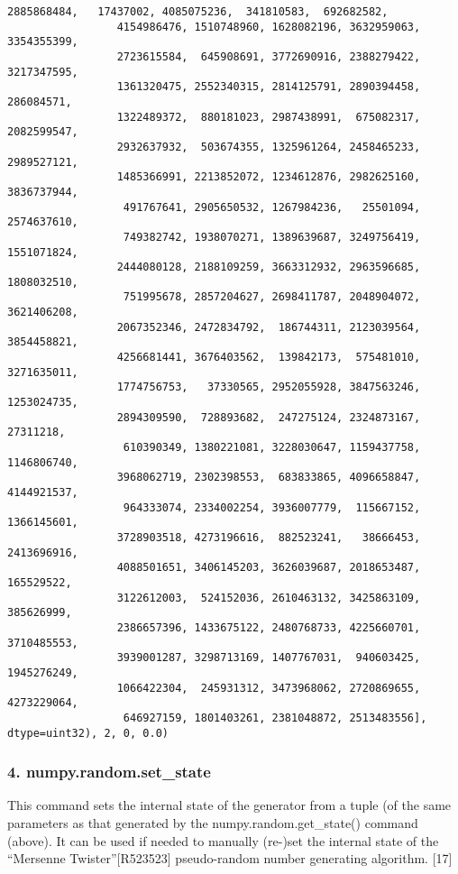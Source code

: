 \documentclass[11pt]{article}
\begin{document}
\begin{Verbatim}[commandchars=\\\{\}]
                 2885868484,   17437002, 4085075236,  341810583,  692682582,
                 4154986476, 1510748960, 1628082196, 3632959063, 3354355399,
                 2723615584,  645908691, 3772690916, 2388279422, 3217347595,
                 1361320475, 2552340315, 2814125791, 2890394458,  286084571,
                 1322489372,  880181023, 2987438991,  675082317, 2082599547,
                 2932637932,  503674355, 1325961264, 2458465233, 2989527121,
                 1485366991, 2213852072, 1234612876, 2982625160, 3836737944,
                  491767641, 2905650532, 1267984236,   25501094, 2574637610,
                  749382742, 1938070271, 1389639687, 3249756419, 1551071824,
                 2444080128, 2188109259, 3663312932, 2963596685, 1808032510,
                  751995678, 2857204627, 2698411787, 2048904072, 3621406208,
                 2067352346, 2472834792,  186744311, 2123039564, 3854458821,
                 4256681441, 3676403562,  139842173,  575481010, 3271635011,
                 1774756753,   37330565, 2952055928, 3847563246, 1253024735,
                 2894309590,  728893682,  247275124, 2324873167,   27311218,
                  610390349, 1380221081, 3228030647, 1159437758, 1146806740,
                 3968062719, 2302398553,  683833865, 4096658847, 4144921537,
                  964333074, 2334002254, 3936007779,  115667152, 1366145601,
                 3728903518, 4273196616,  882523241,   38666453, 2413696916,
                 4088501651, 3406145203, 3626039687, 2018653487,  165529522,
                 3122612003,  524152036, 2610463132, 3425863109,  385626999,
                 2386657396, 1433675122, 2480768733, 4225660701, 3710485553,
                 3939001287, 3298713169, 1407767031,  940603425, 1945276249,
                 1066422304,  245931312, 3473968062, 2720869655, 4273229064,
                  646927159, 1801403261, 2381048872, 2513483556], dtype=uint32), 2, 0, 0.0)
\end{Verbatim}
            
    \subsubsection{4. numpy.random.set\_state}\label{numpy.random.set_state}

    This command sets the internal state of the generator from a tuple (of
the same parameters as that generated by the numpy.random.get\_state()
command (above). It can be used if needed to manually (re-)set the
internal state of the ``Mersenne Twister''{[}R523523{]} pseudo-random
number generating algorithm. {[}17{]}
\end{document}
